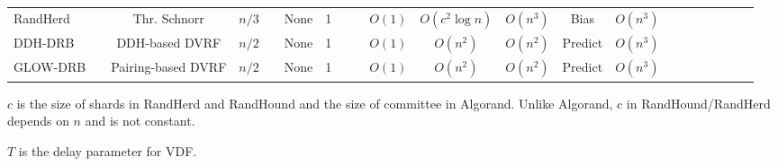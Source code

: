 \documentclass[letterpaper,twocolumn,10pt]{article}
\newcommand{\cmark}{\ding{51}}
\newcommand{\xmark}{\ding{55}}
\theoremstyle{definition}
\theoremstyle{remark}
\begin{document}
\begin{table*}[pt]
\begin{threeparttable}
\begin{tabularx}{\textwidth}{@{} l *{20}c}
RandHerd &  & Thr. Schnorr & $n/3$   & \xmark   & None   & 1   & \xmark    & \xmark   & $O(1)$  & $O(c^2 \log n)$   & $O(n^3)$  & Bias & $O(n^3)$ \\ 
DDH-DRB &  & DDH-based DVRF  & $n/2$ & \xmark   & None   & 1   & \cmark    & \cmark   & $O(1)$  & $O(n^2)$   & $O(n^2)$  & Predict & $O(n^3)$ \\ 
GLOW-DRB &  & Pairing-based DVRF  & $n/2$ & \xmark   & None   & 1   & \cmark    & \cmark   & $O(1)$  & $O(n^2)$   & $O(n^2)$  & Predict & $O(n^3)$ \\ 
\bottomrule
\end{tabularx}
\begin{tablenotes}[flushleft]
\item $c$ is the size of shards in RandHerd and RandHound and the size of committee in Algorand. Unlike Algorand, $c$ in RandHound/RandHerd depends on $n$ and is not constant.
\item $T$ is the delay parameter for VDF.
\end{tablenotes}
\end{threeparttable}
\end{table*}
\end{document}
